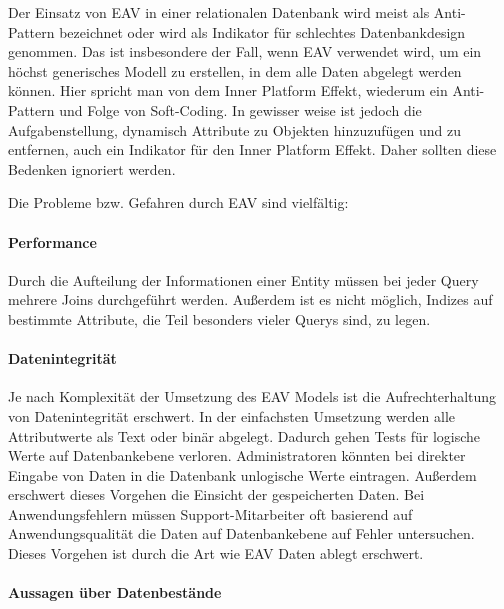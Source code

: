Der Einsatz von EAV in einer relationalen Datenbank wird meist als Anti-Pattern bezeichnet oder wird als Indikator für schlechtes Datenbankdesign genommen. Das ist insbesondere der Fall, wenn EAV verwendet wird, um ein höchst generisches Modell zu erstellen, in dem alle Daten abgelegt werden können. Hier spricht man von dem Inner Platform Effekt, wiederum ein Anti-Pattern und Folge von Soft-Coding\cite{JonHeller.2019}. In gewisser weise ist jedoch die Aufgabenstellung, dynamisch Attribute zu Objekten hinzuzufügen und zu entfernen, auch ein Indikator für den Inner Platform Effekt. Daher sollten diese Bedenken ignoriert werden.

Die Probleme bzw. Gefahren durch EAV sind vielfältig\cite{SmithersMike.2013}:



\paragraph*{Performance}

Durch die Aufteilung der Informationen einer Entity müssen bei jeder Query mehrere Joins durchgeführt werden. Außerdem ist es nicht möglich, Indizes auf bestimmte Attribute, die Teil besonders vieler Querys sind, zu legen.

\paragraph*{Datenintegrität}

Je nach Komplexität der Umsetzung des \ac{EAV} Models ist die Aufrechterhaltung von Datenintegrität erschwert. In der einfachsten Umsetzung werden alle Attributwerte als Text oder binär abgelegt. Dadurch gehen Tests für logische Werte auf Datenbankebene verloren. Administratoren könnten bei direkter Eingabe von Daten in die Datenbank unlogische Werte eintragen. Außerdem erschwert dieses Vorgehen die Einsicht der gespeicherten Daten. Bei Anwendungsfehlern müssen Support-Mitarbeiter oft basierend auf Anwendungsqualität die Daten auf Datenbankebene auf Fehler untersuchen. Dieses Vorgehen ist durch die Art wie \ac{EAV} Daten ablegt erschwert.

\paragraph*{Aussagen über Datenbestände}

